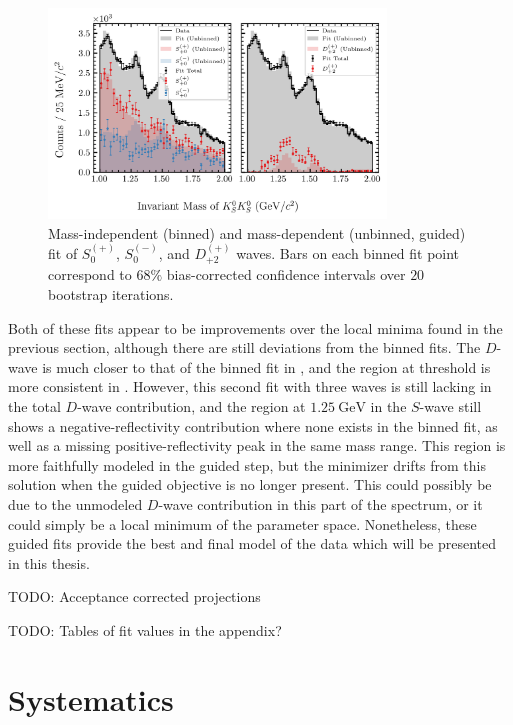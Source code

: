 \begin{figure}
  \begin{center}
    \includegraphics[width=0.8\textwidth]{figures/binned_and_unbinned_fit_chisqdof_3.4_splot_D_1s_2b_guided_phase_factor_waves29099_uncertainty_bootstrap-SE.png}
  \end{center}
  \caption{Mass-independent (binned) and mass-dependent (unbinned, guided) fit of $S_{0}^{(+)}$, $S_{0}^{(-)}$, and $D_{+2}^{(+)}$ waves. Bars on each binned fit point correspond to $68\%$ bias-corrected confidence intervals over $20$ bootstrap iterations.}\label{fig:unbinned-guided-fit-chisqdof-3.4-Spn-D2p}
\end{figure}

Both of these fits appear to be improvements over the local minima found in the previous section, although there are still deviations from the binned fits. The $D$-wave is much closer to that of the binned fit in , and the region at threshold is more consistent in . However, this second fit with three waves is still lacking in the total $D$-wave contribution, and the region at $\SI{1.25}{\giga\electronvolt}$ in the $S$-wave still shows a negative-reflectivity contribution where none exists in the binned fit, as well as a missing positive-reflectivity peak in the same mass range. This region is more faithfully modeled in the guided step, but the minimizer drifts from this solution when the guided objective is no longer present. This could possibly be due to the unmodeled $D$-wave contribution in this part of the spectrum, or it could simply be a local minimum of the parameter space. Nonetheless, these guided fits provide the best and final model of the data which will be presented in this thesis.

{\color{red}TODO: Acceptance corrected projections}

{\color{red}TODO: Tables of fit values in the appendix?}

\section{Systematics}

